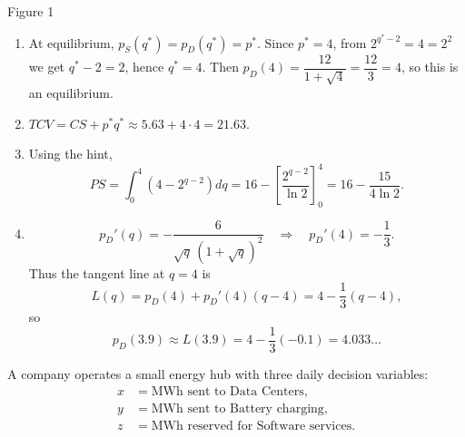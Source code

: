 \documentclass[11pt]{exam}
\begin{document}
\begin{questions}
\begin{minipage}{0.34\textwidth}
\begin{center}

{\small Figure 1}
\end{center}
\end{minipage}

\begin{solution}[0cm]
\begin{enumerate}[leftmargin = 0.5cm, label = (\alph*), rightmargin = 0.2cm]

\item
At equilibrium, $p_S(q^*)=p_D(q^*)=p^*$.  
Since $p^*=4$, from $2^{q^*-2}=4=2^2$ we get $q^*-2=2$, hence $q^*=4$.  
Then $p_D(4)=\dfrac{12}{1+\sqrt4}=\dfrac{12}{3}=4$, so this is an equilibrium.

\item
$
TCV = CS + p^*q^* \approx 5.63 + 4\cdot 4 = 21.63.
$

\item Using the hint,
\[
PS=\int_0^{4}\left(4-2^{q-2}\right)dq
=16-\left[\frac{2^{q-2}}{\ln 2}\right]_{0}^{4}
=16-\frac{15}{4\ln 2}.
\]

\item
\[
p_D'(q)= -\frac{6}{\sqrt{q}\,(1+\sqrt{q})^2}
\quad\Rightarrow\quad
p_D'(4)=-\frac{1}{3}.
\]
Thus the tangent line at $q=4$ is
\[
L(q)=p_D(4)+p_D'(4)(q-4)=4-\frac{1}{3}(q-4),
\]
so
\[
p_D(3.9)\approx L(3.9)=4-\frac{1}{3}(-0.1)=4.033\ldots
\]

\end{enumerate}
\end{solution}


\question[3]
A company operates a small energy hub with three daily decision variables:
\begin{align*}
    x&=\text{MWh sent to Data Centers}, \\
    y&=\text{MWh sent to Battery charging},\\
    z&=\text{MWh reserved for Software services}.
\end{align*}


\end{questions}
\end{document}
